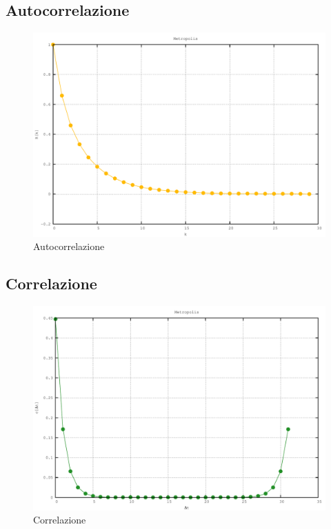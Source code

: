 \subsection{Autocorrelazione}

\begin{figure}[H]
\centering
\includegraphics[width=\textwidth]{autocorrelation}
\caption{Autocorrelazione}
\label{fig:autocorrelation}
\end{figure}

\subsection{Correlazione}

\begin{figure}[H]
\centering
\includegraphics[width=\textwidth]{correlation}
\caption{Correlazione}
\label{fig:correlation}
\end{figure}

